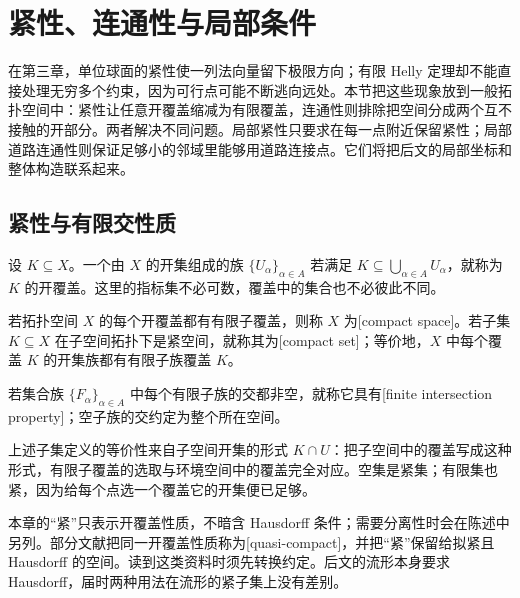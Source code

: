 
% 
% 

\section{紧性、连通性与局部条件}
\label{g1:sec:0402}

在第三章，单位球面的紧性使一列法向量留下极限方向；有限 Helly 定理却不能直接处理无穷多个约束，因为可行点可能不断逃向远处。本节把这些现象放到一般拓扑空间中：紧性让任意开覆盖缩减为有限覆盖，连通性则排除把空间分成两个互不接触的开部分。两者解决不同问题。局部紧性只要求在每一点附近保留紧性；局部道路连通性则保证足够小的邻域里能够用道路连接点。它们将把后文的局部坐标和整体构造联系起来。

\subsection{紧性与有限交性质}
\label{g1:subsec:0402:01}

设 \(K\subseteq X\)。一个由 \(X\) 的开集组成的族 \(\{U_\alpha\}_{\alpha\in A}\) 若满足 \(K\subseteq\bigcup_{\alpha\in A}U_\alpha\)，就称为 \(K\) 的开覆盖。这里的指标集不必可数，覆盖中的集合也不必彼此不同。

\begin{definition}[紧性与有限交性质]\label{g1:def:compact}
	若拓扑空间 \(X\) 的每个开覆盖都有有限子覆盖，则称 \(X\) 为[compact space]。若子集 \(K\subseteq X\) 在子空间拓扑下是紧空间，就称其为[compact set]；等价地，\(X\) 中每个覆盖 \(K\) 的开集族都有有限子族覆盖 \(K\)。

	若集合族 \(\{F_\alpha\}_{\alpha\in A}\) 中每个有限子族的交都非空，就称它具有[finite intersection property]；空子族的交约定为整个所在空间。
\end{definition}

上述子集定义的等价性来自子空间开集的形式 \(K\cap U\)：把子空间中的覆盖写成这种形式，有限子覆盖的选取与环境空间中的覆盖完全对应。空集是紧集；有限集也紧，因为给每个点选一个覆盖它的开集便已足够。

\ProseParagraphBreak

本章的“紧”只表示开覆盖性质，不暗含 Hausdorff 条件；需要分离性时会在陈述中另列。部分文献把同一开覆盖性质称为[quasi-compact]，并把“紧”保留给拟紧且 Hausdorff 的空间。读到这类资料时须先转换约定。后文的流形本身要求 Hausdorff，届时两种用法在流形的紧子集上没有差别。

